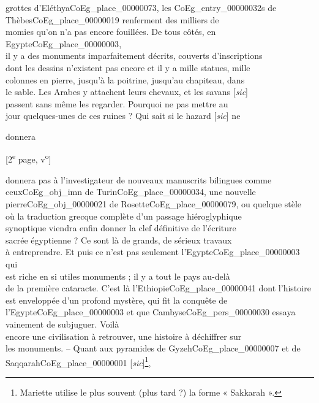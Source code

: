 \documentclass{book}
\begin{document}
grottes d’Eléthya\gls{CoEg_place_00000073}, les \glspl{CoEg_entry_00000032} de Thèbes\gls{CoEg_place_00000019} renferment des milliers de\\
momies qu’on n’a pas encore fouillées. De tous côtés, en Egypte\gls{CoEg_place_00000003},\\
il y a des monuments imparfaitement décrits, couverts d’inscriptions\\
dont les dessins n’existent pas encore et il y a mille statues, mille\\
colonnes en pierre, jusqu’à la poitrine, jusqu’au chapiteau, dans\\
le sable. Les Arabes y attachent leurs chevaux, et les savans [\textit{sic}]\\
passent sans même les regarder. Pourquoi ne pas mettre au\\
jour quelques-unes de ces ruines ? Qui sait si le hazard [\textit{sic}] ne
\begin{flushright}donnera\end{flushright}
{\footnotesize \begin{center} {[2\textsuperscript{e} page, v\textsuperscript{o}]}\end{center}}
\noindent donnera pas à l’investigateur de nouveaux manuscrits bilingues comme\\
ceux\gls{CoEg_obj_imn} de Turin\gls{CoEg_place_00000034}, une nouvelle pierre\gls{CoEg_obj_00000021} de Rosette\gls{CoEg_place_00000079}, ou quelque stèle\\
où la traduction grecque complète d’un passage hiéroglyphique\\
synoptique viendra enfin donner la clef définitive de l’écriture\\
sacrée égyptienne ? Ce sont là de grands, de sérieux travaux\\
à entreprendre. Et puis ce n’est pas seulement l’Egypte\gls{CoEg_place_00000003} qui\\
est riche en si utiles monuments ; il y a tout le pays au-delà\\
de la première cataracte. C’est là l’Ethiopie\gls{CoEg_place_00000041} dont l’histoire\\
est enveloppée d’un profond mystère, qui fit la conquête de\\
l’Egypte\gls{CoEg_place_00000003} et que Cambyse\gls{CoEg_pers_00000030} essaya vainement de subjuguer. Voilà\\
encore une civilisation à retrouver, une histoire à déchiffrer sur\\
les monuments. – Quant aux pyramides de Gyzeh\gls{CoEg_place_00000007} et de Saqqarah\gls{CoEg_place_00000001} [\textit{sic}]\footnote{Mariette utilise le plus souvent (plus tard ?) la forme « Sakkarah ».},\\
\end{document}
